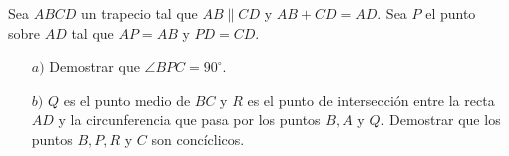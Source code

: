 Sea $ABCD$ un trapecio tal que $AB\parallel CD$ y $AB+CD=AD$. Sea $P$ el punto sobre $AD$ tal que $AP=AB$ y $PD=CD$.

\begin{enumerate}
    \item[$a)$] Demostrar que $\angle BPC=90^{\circ}$.
    \item[$b)$]  $Q$ es el punto medio de $BC$ y $R$ es el punto de intersección entre la recta $AD$ y la circunferencia que pasa por los puntos $B,A$ y $Q$. Demostrar que los puntos $B,P,R$ y $C$ son concíclicos.
\end{enumerate}
